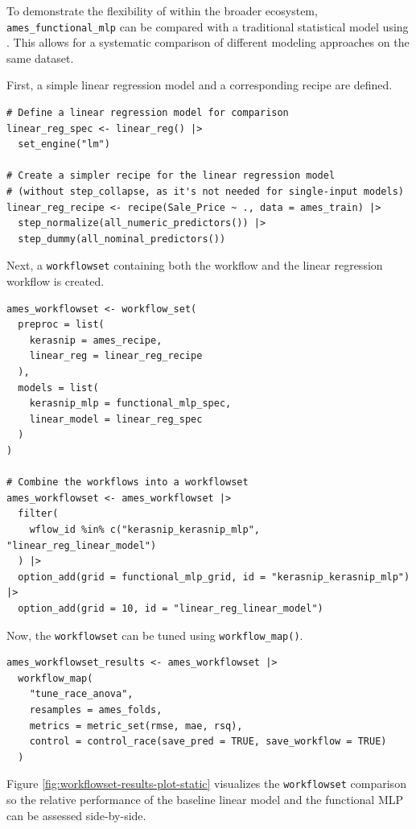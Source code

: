 To demonstrate the flexibility of  within the broader  ecosystem, \texttt{ames\_functional\_mlp} can be compared with a traditional statistical model using . This allows for a systematic comparison of different modeling approaches on the same dataset.

First, a simple linear regression model and a corresponding recipe are defined.

\begin{verbatim}
# Define a linear regression model for comparison
linear_reg_spec <- linear_reg() |>
  set_engine("lm")

# Create a simpler recipe for the linear regression model
# (without step_collapse, as it's not needed for single-input models)
linear_reg_recipe <- recipe(Sale_Price ~ ., data = ames_train) |>
  step_normalize(all_numeric_predictors()) |>
  step_dummy(all_nominal_predictors())
\end{verbatim}

Next, a \texttt{workflowset} containing both the  workflow and the linear regression workflow is created.

\begin{verbatim}
ames_workflowset <- workflow_set(
  preproc = list(
    kerasnip = ames_recipe,
    linear_reg = linear_reg_recipe
  ),
  models = list(
    kerasnip_mlp = functional_mlp_spec,
    linear_model = linear_reg_spec
  )
)

# Combine the workflows into a workflowset
ames_workflowset <- ames_workflowset |>
  filter(
    wflow_id %in% c("kerasnip_kerasnip_mlp", "linear_reg_linear_model")
  ) |>
  option_add(grid = functional_mlp_grid, id = "kerasnip_kerasnip_mlp") |>
  option_add(grid = 10, id = "linear_reg_linear_model")
\end{verbatim}

Now, the \texttt{workflowset} can be tuned using \texttt{workflow\_map()}.

\begin{verbatim}
ames_workflowset_results <- ames_workflowset |>
  workflow_map(
    "tune_race_anova",
    resamples = ames_folds,
    metrics = metric_set(rmse, mae, rsq),
    control = control_race(save_pred = TRUE, save_workflow = TRUE)
  )
\end{verbatim}

Figure \ref{fig:workflowset-results-plot-static} visualizes the \texttt{workflowset} comparison so the relative performance of the baseline linear model and the functional MLP can be assessed side-by-side.

